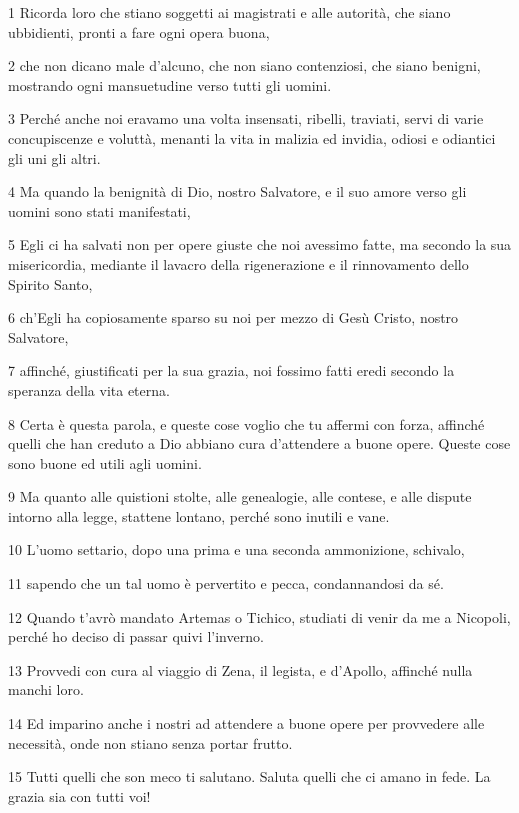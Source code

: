 \par 1 Ricorda loro che stiano soggetti ai magistrati e alle autorità, che siano ubbidienti, pronti a fare ogni opera buona,
\par 2 che non dicano male d'alcuno, che non siano contenziosi, che siano benigni, mostrando ogni mansuetudine verso tutti gli uomini.
\par 3 Perché anche noi eravamo una volta insensati, ribelli, traviati, servi di varie concupiscenze e voluttà, menanti la vita in malizia ed invidia, odiosi e odiantici gli uni gli altri.
\par 4 Ma quando la benignità di Dio, nostro Salvatore, e il suo amore verso gli uomini sono stati manifestati,
\par 5 Egli ci ha salvati non per opere giuste che noi avessimo fatte, ma secondo la sua misericordia, mediante il lavacro della rigenerazione e il rinnovamento dello Spirito Santo,
\par 6 ch'Egli ha copiosamente sparso su noi per mezzo di Gesù Cristo, nostro Salvatore,
\par 7 affinché, giustificati per la sua grazia, noi fossimo fatti eredi secondo la speranza della vita eterna.
\par 8 Certa è questa parola, e queste cose voglio che tu affermi con forza, affinché quelli che han creduto a Dio abbiano cura d'attendere a buone opere. Queste cose sono buone ed utili agli uomini.
\par 9 Ma quanto alle quistioni stolte, alle genealogie, alle contese, e alle dispute intorno alla legge, stattene lontano, perché sono inutili e vane.
\par 10 L'uomo settario, dopo una prima e una seconda ammonizione, schivalo,
\par 11 sapendo che un tal uomo è pervertito e pecca, condannandosi da sé.
\par 12 Quando t'avrò mandato Artemas o Tichico, studiati di venir da me a Nicopoli, perché ho deciso di passar quivi l'inverno.
\par 13 Provvedi con cura al viaggio di Zena, il legista, e d'Apollo, affinché nulla manchi loro.
\par 14 Ed imparino anche i nostri ad attendere a buone opere per provvedere alle necessità, onde non stiano senza portar frutto.
\par 15 Tutti quelli che son meco ti salutano. Saluta quelli che ci amano in fede. La grazia sia con tutti voi!


